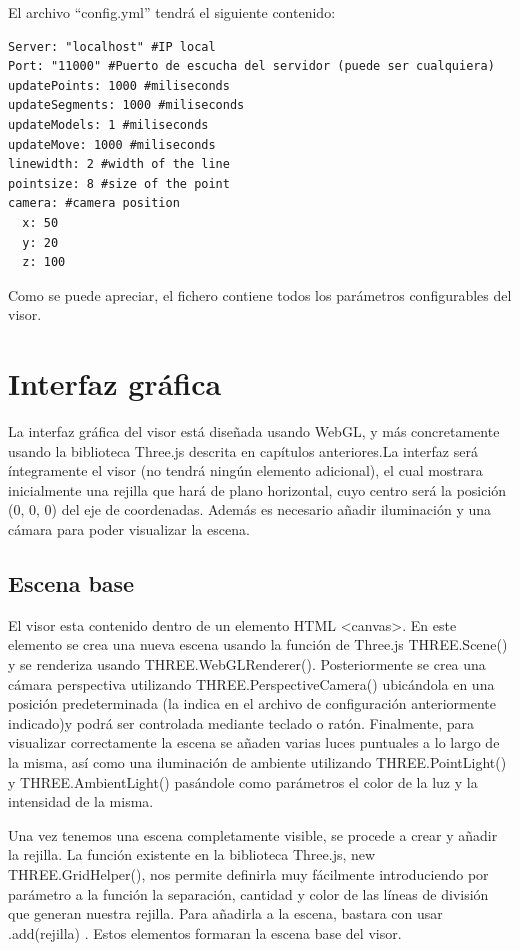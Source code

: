 El archivo ``config.yml'' tendrá el siguiente contenido:
\begin{lstlisting}[frame=single]
Server: "localhost" #IP local
Port: "11000" #Puerto de escucha del servidor (puede ser cualquiera)
updatePoints: 1000 #miliseconds
updateSegments: 1000 #miliseconds
updateModels: 1 #miliseconds
updateMove: 1000 #miliseconds
linewidth: 2 #width of the line
pointsize: 8 #size of the point
camera: #camera position
  x: 50
  y: 20
  z: 100
\end{lstlisting}
Como se puede apreciar, el fichero contiene todos los parámetros configurables del visor.

\section{Interfaz gráfica}
La interfaz gráfica del visor está diseñada usando WebGL, y más concretamente usando la biblioteca Three.js descrita en capítulos anteriores.La interfaz será íntegramente el visor (no tendrá ningún elemento adicional), el cual mostrara inicialmente una rejilla que hará de plano horizontal, cuyo centro será la posición (0, 0, 0) del eje de coordenadas. Además es necesario añadir iluminación y una cámara para poder visualizar la escena.

\subsection{Escena base}
El visor esta contenido dentro de un elemento HTML <canvas>. En este elemento se crea una nueva escena usando la función de Three.js THREE.Scene() y se renderiza usando THREE.WebGLRenderer(). Posteriormente se crea una cámara perspectiva utilizando THREE.PerspectiveCamera() ubicándola en una posición predeterminada (la indica en el archivo de configuración anteriormente indicado)y podrá ser controlada mediante teclado o ratón. Finalmente, para visualizar correctamente la escena se añaden varias luces puntuales a lo largo de la misma, así como una iluminación de ambiente utilizando THREE.PointLight() y THREE.AmbientLight() pasándole como parámetros el color de la luz y la intensidad de la misma.


Una vez tenemos una escena completamente visible, se procede a crear y añadir la rejilla. La función existente en la biblioteca Three.js, new THREE.GridHelper(), nos permite definirla muy fácilmente introduciendo por parámetro a la función la separación, cantidad y color de las líneas de división que generan nuestra rejilla. Para añadirla a la escena, bastara con usar .add(rejilla) . Estos elementos formaran la escena base del visor.

